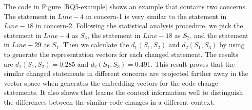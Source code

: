 The code in Figure \ref{RQ5-example} shows an example that contains two concerns. The statement in $Line-4$ in concern-1 is very similar to the statement in $Line-18$ in concern-2. Following the statistical analysis procedure, we pick the statement in $Line-4$ as $S_3$, the statement in $Line-18$ as $S_2$, and the statement in $Line-29$ as $S_1$. Then we calculate the $d_1(S_1,S_2)$ and $d_2(S_1,S_3)$ by using \tool to generate the representation vectors for each changed statement. The results are $d_1(S_1,S_2) = 0.285$ and $d_2(S_1,S_3)=0.491$. This result proves that the similar changed statements in different concerns are projected farther away in the vector space when \tool generates the embedding vectors for the code change statements. It also shows that \tool learns the context information well to distinguish the differences between the similar code changes in a different context.

